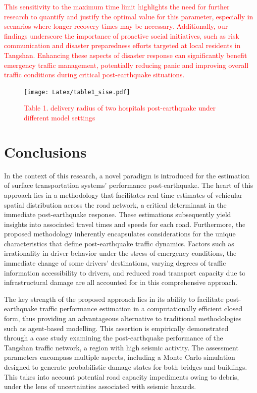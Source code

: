 \documentclass[review,11pt,nonatbib]{elsarticle}
\begin{document}
\textcolor{red}{This sensitivity to the maximum time limit highlights the need for further research to quantify and justify the optimal value for this parameter, especially in scenarios where longer recovery times may be necessary.}
\textcolor{red}{Additionally, our findings underscore the importance of proactive social initiatives, such as risk communication and disaster preparedness efforts targeted at local residents in Tangshan. Enhancing these aspects of disaster response can significantly benefit emergency traffic management, potentially reducing panic and improving overall traffic conditions during critical post-earthquake situations.} 

\captionsetup[figure]{labelformat=empty}
\begin{figure}[!htp]\centering
\caption[]{\textcolor{red}{Table 1. delivery radius of two hospitals post-earthquake under different model settings}}\label{fig12}
\texttt{[image: Latex/table1\_sise.pdf]}\\
\end{figure}
\captionsetup[figure]{labelformat=default}


\section{Conclusions}

In the context of this research, a novel paradigm is introduced for the estimation of surface transportation systems' performance post-earthquake. The heart of this approach lies in a methodology that facilitates real-time estimates of vehicular spatial distribution across the road network, a critical determinant in the immediate post-earthquake response. These estimations subsequently yield insights into associated travel times and speeds for each road. Furthermore, the proposed methodology inherently encapsulates considerations for the unique characteristics that define post-earthquake traffic dynamics. Factors such as irrationality in driver behavior under the stress of emergency conditions, the immediate change of some drivers' destinations, varying degrees of traffic information accessibility to drivers, and reduced road transport capacity due to infrastructural damage are all accounted for in this comprehensive approach.

The key strength of the proposed approach lies in its ability to facilitate post-earthquake traffic performance estimation in a computationally efficient closed form, thus providing an advantageous alternative to traditional methodologies such as agent-based modelling. This assertion is empirically demonstrated through a case study examining the post-earthquake performance of the Tangshan traffic network, a region with high seismic activity. The assessment parameters encompass multiple aspects, including a Monte Carlo simulation designed to generate probabilistic damage states for both bridges and buildings. This takes into account potential road capacity impediments owing to debris, under the lens of uncertainties associated with seismic hazards.
\end{document}
